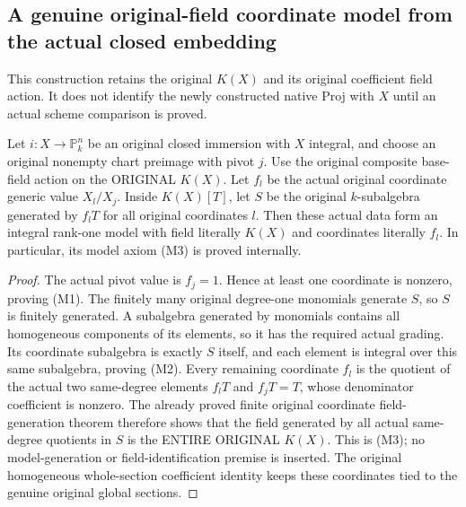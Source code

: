 \subsection{A genuine original-field coordinate model from the actual closed embedding}
This construction retains the original $K(X)$ and its original coefficient
field action. It does not identify the newly constructed native Proj with
$X$ until an actual scheme comparison is proved.

\begin{theorem}
\label{thm:seven-original-closed-embedding-model-route}
\leanok
{}
Let $i:X\to\mathbb P^n_k$ be an original closed immersion with $X$
integral, and choose an original nonempty chart preimage with pivot $j$.
Use the original composite base-field action on the ORIGINAL $K(X)$.
Let $f_l$ be the actual original coordinate generic value $X_l/X_j$.
Inside $K(X)[T]$, let $S$ be the original $k$-subalgebra generated by
$f_lT$ for all original coordinates $l$. Then these actual data form
an integral rank-one model with field literally $K(X)$ and coordinates
literally $f_l$. In particular, its model axiom (M3) is proved internally.
\end{theorem}
\begin{proof}
The actual pivot value is $f_j=1$. Hence at least one coordinate is
nonzero, proving (M1). The finitely many original degree-one monomials
generate $S$, so $S$ is finitely generated. A subalgebra generated by
monomials contains all homogeneous components of its elements, so it
has the required actual grading. Its coordinate subalgebra is exactly
$S$ itself, and each element is integral over this same subalgebra,
proving (M2). Every remaining coordinate $f_l$ is the quotient of the
actual two same-degree elements $f_lT$ and $f_jT=T$, whose denominator
coefficient is nonzero. The already proved finite original coordinate
field-generation theorem therefore shows that the field generated by
all actual same-degree quotients in $S$ is the ENTIRE ORIGINAL $K(X)$.
This is (M3); no model-generation or field-identification premise is
inserted. The original homogeneous whole-section coefficient identity
keeps these coordinates tied to the genuine original global sections.
\end{proof}

